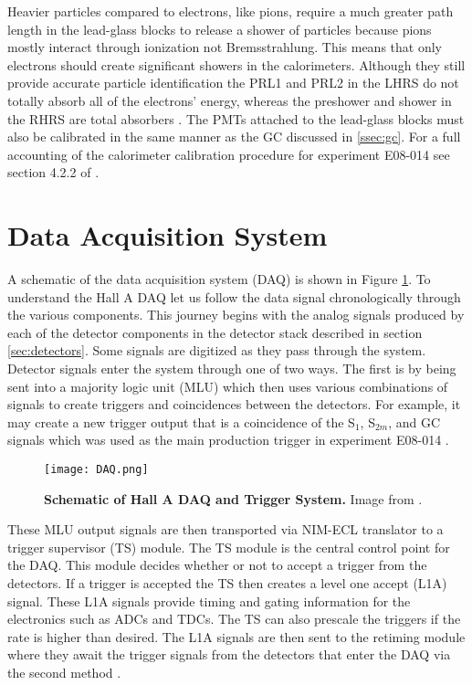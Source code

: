 Heavier particles compared to electrons, like pions, require a much greater path length in the lead-glass blocks to release a shower of particles because pions mostly interact through ionization not Bremsstrahlung. This means that only electrons should create significant showers in the calorimeters. Although they still provide accurate particle identification the PRL1 and PRL2 in the LHRS do not totally absorb all of the electrons' energy, whereas the preshower and shower in the RHRS are total absorbers \cite{Thesis:Ye}. The PMTs attached to the lead-glass blocks must also be calibrated in the same manner as the GC discussed in \ref{ssec:gc}. For a full accounting of the calorimeter calibration procedure for experiment E08-014 see section 4.2.2 of \cite{Thesis:Ye}.

\section{Data Acquisition System}
\label{sec:daq}

A schematic of the data acquisition system (DAQ) is shown in Figure \ref{fig:daq}. To understand the Hall A DAQ let us follow the data signal chronologically through the various components. This journey begins with the analog signals produced by each of the detector components in the detector stack described in section \ref{sec:detectors}. Some signals are digitized as they pass through the system. Detector signals enter the system through one of two ways. The first is by being sent into a majority logic unit (MLU) which then uses various combinations of signals to create triggers and coincidences between the detectors. For example, it may create a new trigger output that is a coincidence of the S$_1$, S$_{2m}$, and GC signals which was used as the main production trigger in experiment E08-014 \cite{DAQ}. 

\begin{figure}[!ht]
\begin{center}
\texttt{[image: DAQ.png]}
\end{center}
\caption[Schematic of Hall A DAQ and Trigger System]{
{\bf{Schematic of Hall A DAQ and Trigger System.}} Image from \cite{DAQ}.}
\label{fig:daq}
\end{figure}

These MLU output signals are then transported via NIM-ECL translator to a trigger supervisor (TS) module. The TS module is the central control point for the DAQ. This module decides whether or not to accept a trigger from the detectors. If a trigger is accepted the TS then creates a level one accept (L1A) signal. These L1A signals provide timing and gating information for the electronics such as ADCs and TDCs. The TS can also prescale the triggers if the rate is higher than desired. The L1A signals are then sent to the retiming module where they await the trigger signals from the detectors that enter the DAQ via the second method \cite{DAQ}.

